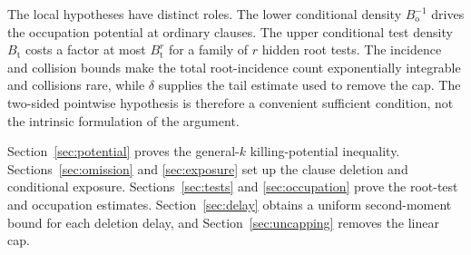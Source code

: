 The local hypotheses have distinct roles.  The lower conditional density
$B_{\mathrm{o}}^{-1}$ drives the occupation potential at ordinary clauses.  The
upper conditional test density $B_{\mathrm{t}}$ costs a factor at most
$B_{\mathrm{t}}^r$ for a family of $r$ hidden root tests.  The incidence and
collision bounds make the total root-incidence count exponentially
integrable and collisions rare, while $\delta$ supplies the tail estimate
used to remove the cap.  The two-sided pointwise hypothesis is therefore a
convenient sufficient condition, not the intrinsic formulation of the
argument.

Section~\ref{sec:potential} proves the general-$k$ killing-potential
inequality.  Sections~\ref{sec:omission} and \ref{sec:exposure} set up the
clause deletion and conditional exposure.  Sections~\ref{sec:tests} and
\ref{sec:occupation} prove the root-test and occupation estimates.
Section~\ref{sec:delay} obtains a uniform second-moment bound for each
deletion delay, and Section~\ref{sec:uncapping} removes the linear cap.
